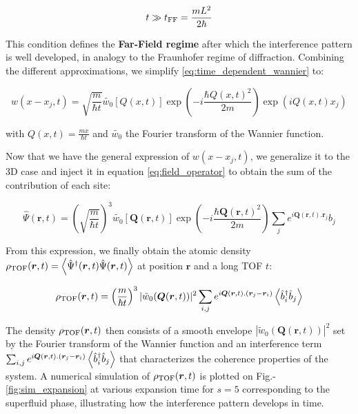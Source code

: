 \begin{equation}
    t \gg t_{\rm{FF}} = \frac{mL^2}{2 \hbar}
    \label{eq:far_field}
\end{equation}

\noindent This condition defines the \textbf{Far-Field regime} after which the interference pattern is well developed, in analogy to the Fraunhofer regime of diffraction. Combining the different approximations, we simplify \ref{eq:time_dependent_wannier} to:

\begin{equation}
    w\left(x-x_{j}, t\right)=\sqrt{\frac{m}{\hbar t}} \tilde{w_0}[Q(x,t)] \exp\left(-i \frac{\hbar Q(x,t)^{2}}{2 m} \right) \exp\left(i Q(x,t) x_{j}\right)
\end{equation}

\noindent with $Q(x,t)=\frac{m x}{\hbar t}$ and $\tilde{w_0}$ the Fourier transform of the Wannier function. 

Now that we have the general expression of $w\left(x-x_{j}, t\right)$, we generalize it to the 3D case and inject it in equation \ref{eq:field_operator} to obtain the sum of the contribution of each site:

\begin{equation}
    \hat{\Psi} (\bm{r},t) = \left(\sqrt{\frac{m}{\hbar t}} \right)^3 \tilde{w_0}[\bm{Q}(\bm{r},t)] \exp\left(-i \frac{\hbar \bm{Q}(\bm{r},t)^{2}}{2 m} \right) \sum_j e^{i \bm{Q}(\bm{r},t). \bm{r}_{j}} \hat{b}_j
\end{equation}

\noindent From this expression, we finally obtain the atomic density $\rho_{\rm{TOF}}(\bm{r},t) = \left\langle\hat{\Psi}^{\dagger} (\bm{r},t) \hat{\Psi} (\bm{r},t)\right\rangle$ at position $\bm{r}$ and a long TOF $t$:

\begin{equation}
    \rho_{\rm{TOF}}(\bm{r},t) = \left(\frac{m}{\hbar t} \right)^3 |\tilde{w}_0(\bm{Q}(\bm{r},t))|^2 \sum_{i,j} e^{i \bm{Q}(\bm{r},t).(\bm{r}_j - \bm{r}_{i})} \left\langle\hat{b}^{\dagger}_i \hat{b}_j \right\rangle
    \label{eq:rho_tof}
\end{equation}

\noindent The density $\rho_{\rm{TOF}}(\bm{r},t)$ then consists of a smooth envelope $|\tilde{w}_0(\bm{Q}(\bm{r},t))|^2$ set by the Fourier transform of the Wannier function and an interference term $\sum_{i,j} e^{i \bm{Q}(\bm{r},t).(\bm{r}_j - \bm{r}_{i})} \left\langle\hat{b}^{\dagger}_i \hat{b}_j \right\rangle$ that characterizes the coherence properties of the system. A numerical simulation of $\rho_{\rm{TOF}}(\bm{r},t)$ is plotted on Fig.-\ref{fig:sim_expansion} at various expansion time for $s=5$ corresponding to the superfluid phase, illustrating how the interference pattern develops in time.

